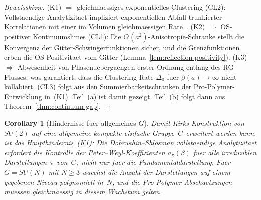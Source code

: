 \documentclass[12pt,a4paper]{article}
\theoremstyle{definition}
\theoremstyle{plain}
\newtheorem{corollary}[definition]{Corollary}
\theoremstyle{remark}
\begin{document}
\begin{proof}[Beweisskizze]
(K1) $\Rightarrow$ gleichmaessiges exponentielles Clustering (CL2): Vollstaendige Analytizitaet
impliziert exponentiellen Abfall trunkierter Korrelationen mit einer im Volumen gleichmaessigen
Rate~\cite{DobrushinShlosman1985}. (K2) $\Rightarrow$ OS-positiver Kontinuumslimes (CL1):
Die $O(a^2)$-Anisotropie-Schranke stellt die Konvergenz der Gitter-Schwingerfunktionen
sicher, und die Grenzfunktionen erben die OS-Positivitaet vom Gitter
(Lemma~\ref{lem:reflection-positivity}). (K3) $\Rightarrow$ Abwesenheit von
Phasenuebergaengen erster Ordnung entlang des RG-Flusses, was garantiert, dass die
Clustering-Rate $\Delta_0$ fuer $\beta(a) \to \infty$ nicht kollabiert. (CL3) folgt
aus den Summierbarkeitschranken der Pro-Polymer-Entwicklung in~(K1). Teil~(a) ist
damit gezeigt. Teil~(b) folgt dann aus Theorem~\ref{thm:continuum-gap}.
\end{proof}

\begin{corollary}[Hindernisse fuer allgemeines $G$]
Damit Kirks Konstruktion von $SU(2)$ auf eine allgemeine kompakte einfache
Gruppe~$G$ erweitert werden kann, ist das Haupthindernis~\textup{(K1)}: Die
Dobrushin--Shlosman vollstaendige Analytizitaet erfordert die Kontrolle der
Peter--Weyl-Koeffizienten $a_\pi(\beta)$ fuer \emph{alle} irreduziblen
Darstellungen~$\pi$ von~$G$, nicht nur fuer die Fundamentaldarstellung. Fuer
$G = SU(N)$ mit $N \geq 3$ waechst die Anzahl der Darstellungen auf einem gegebenen
Niveau polynomiell in~$N$, und die Pro-Polymer-Abschaetzungen muessen gleichmaessig
in diesem Wachstum gelten.
\end{corollary}
\end{document}
